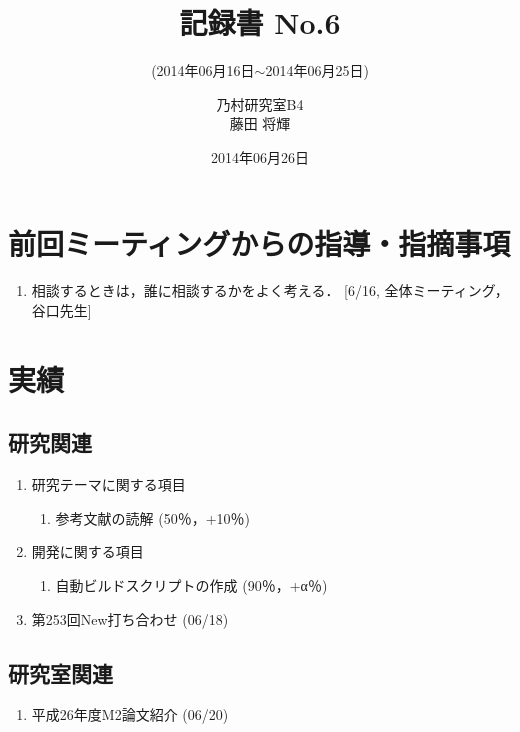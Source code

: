 \documentclass[fleqn, 14pt]{extarticle}
\subtitle{(2014年06月16日$\sim$2014年06月25日)}
\author{乃村研究室B4\\藤田 将輝}
\date{2014年06月26日}
\title{記録書 No.6}
\begin{document}
\maketitle




\section{前回ミーティングからの指導・指摘事項}
\label{sec-1}
\begin{enumerate}
\item 相談するときは，誰に相談するかをよく考える．
\newline
\hfill
[6/16, 全体ミーティング，谷口先生]
\end{enumerate}




\section{実績}
\label{sec-2}


\subsection{研究関連}
\label{sec-2-1}
\begin{enumerate}
\item 研究テーマに関する項目
\hfill
\label{enum-research1}
\begin{enumerate}

\item 参考文献の読解
\hfill
\label{enum-1-A}
(50％，+10％)
\end{enumerate}
\item 開発に関する項目
\hfill
\label{enum-research2}
\begin{enumerate}

\item 自動ビルドスクリプトの作成
\hfill
\label{enum-2-A}
(90％，+α％)
\end{enumerate}

\item 第253回New打ち合わせ
\hfill
\label{enum-laboratory2}
(06/18)

\end{enumerate}


\subsection{研究室関連}
\label{sec-2-2}

\begin{enumerate}
\item 平成26年度M2論文紹介
\hfill
\label{enum-laboratory1}
(06/20)

\end{enumerate}
\end{document}
